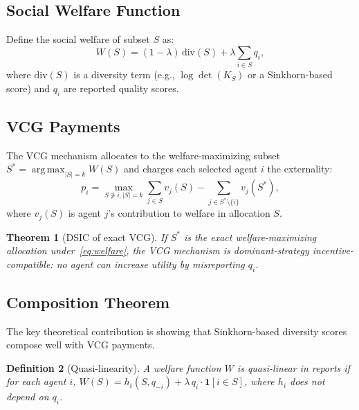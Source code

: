 \documentclass[10pt]{article}
\newtheorem{theorem}{Theorem}
\newtheorem{definition}[theorem]{Definition}
\DeclareMathOperator*{\argmax}{arg\,max}
\begin{document}
\subsection{Social Welfare Function}

Define the social welfare of subset $S$ as:
\begin{equation}
W(S) = (1-\lambda)\, \mathrm{div}(S) + \lambda \sum_{i \in S} q_i,
\label{eq:welfare}
\end{equation}
where $\mathrm{div}(S)$ is a diversity term (e.g., $\log\det(K_S)$ or a Sinkhorn-based score) and $q_i$ are reported quality scores.

\subsection{VCG Payments}

The VCG mechanism allocates to the welfare-maximizing subset $S^* = \argmax_{|S|=k} W(S)$ and charges each selected agent $i$ the externality:
\begin{equation}
p_i = \max_{S \not\ni i, |S|=k} \sum_{j \in S} v_j(S) - \sum_{j \in S^* \setminus \{i\}} v_j(S^*),
\label{eq:vcg-payment}
\end{equation}
where $v_j(S)$ is agent $j$'s contribution to welfare in allocation $S$.

\begin{theorem}[DSIC of exact VCG]
\label{thm:vcg}
If $S^*$ is the exact welfare-maximizing allocation under~\eqref{eq:welfare}, the VCG mechanism is dominant-strategy incentive-compatible: no agent can increase utility by misreporting $q_i$.
\end{theorem}

\subsection{Composition Theorem}

The key theoretical contribution is showing that Sinkhorn-based diversity scores compose well with VCG payments.

\begin{definition}[Quasi-linearity]
\label{def:quasi-linear}
\label{lem:quasi-linear}
A welfare function $W$ is \emph{quasi-linear in reports} if for each agent $i$,
$W(S) = h_i(S, q_{-i}) + \lambda\, q_i \cdot \mathbf{1}[i \in S]$,
where $h_i$ does not depend on $q_i$.
\end{definition}
\end{document}
